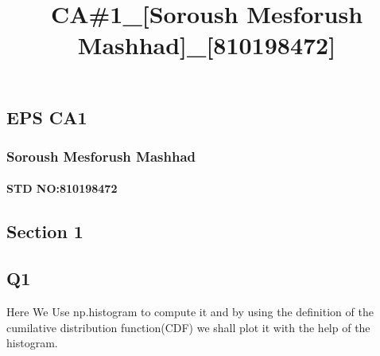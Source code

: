 \documentclass[11pt]{article}
\title{CA\#1\_[Soroush Mesforush Mashhad]\_[810198472]}
\date{}
\begin{document}
    
    \maketitle
    
    

    
    \hypertarget{eps-ca1}{%
\subsection{EPS CA1}\label{eps-ca1}}

\hypertarget{soroush-mesforush-mashhad}{%
\subsubsection{Soroush Mesforush
Mashhad}\label{soroush-mesforush-mashhad}}

\hypertarget{std-no810198472}{%
\paragraph{STD NO:810198472}\label{std-no810198472}}

    \hypertarget{section-1}{%
\subsection{Section 1}\label{section-1}}

    \hypertarget{q1}{%
\subsection{Q1}\label{q1}}

Here We Use np.histogram to compute it and by using the definition of
the cumilative distribution function(CDF) we shall plot it with the help
of the histogram.
\end{document}
